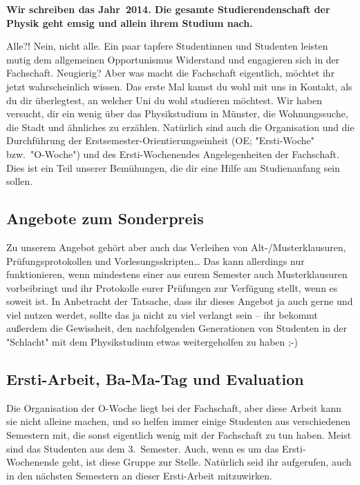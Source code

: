 \begin{multicols}{2}
\renewcommand{\fibelsubsectionpre}{\fibelsubsubsectionpre}
\renewcommand{\fibelsubsectionpost}{\fibelsubsubsectionpost}
\textbf{Wir schreiben das Jahr~2014. Die gesamte Studierendenschaft der Physik geht emsig und allein ihrem Studium nach.}

Alle?! Nein, nicht alle. Ein paar tapfere Studentinnen und Studenten leisten mutig dem allgemeinen Opportunismus Widerstand und engagieren sich in der Fachschaft. Neugierig? Aber was macht die Fachschaft eigentlich, möchtet ihr jetzt wahrscheinlich wissen. Das erste Mal kamst du wohl mit uns in Kontakt, als du dir überlegtest, an welcher Uni du wohl studieren möchtest. Wir haben versucht, dir ein wenig über das Physikstudium in Münster, die Wohnungssuche, die Stadt und ähnliches zu erzählen. Natürlich sind auch die Organisation und die Durchführung der Erstsemester-Orientierungseinheit (OE; "Ersti-Woche" bzw.\ "O-Woche") und des Ersti-Wochenendes Angelegenheiten der Fachschaft. Dies ist ein Teil unserer Bemühungen, die dir eine Hilfe am Studienanfang sein sollen.

\subsection*{Angebote zum Sonderpreis}
Zu unserem Angebot gehört aber auch das Verleihen von Alt-/Musterklausuren, Prüfungsprotokollen und Vorlesungsskripten\dots{} Das kann allerdings nur funktionieren, wenn mindestens einer aus eurem Semester auch Musterklausuren vorbeibringt und ihr Protokolle eurer Prüfungen zur Verfügung stellt, wenn es soweit ist. In Anbetracht der Tatsache, dass ihr dieses Angebot ja auch gerne und viel nutzen werdet, sollte das ja nicht zu viel verlangt sein -- ihr bekommt außerdem die Gewissheit, den nachfolgenden Generationen von Studenten in der "Schlacht" mit dem Physikstudium etwas weitergeholfen zu haben ;-)

\subsection*{Ersti-Arbeit, Ba-Ma-Tag und Evaluation}
Die Organisation der O-Woche liegt bei der Fachschaft, aber diese Arbeit kann sie nicht alleine machen, und so helfen immer einige Studenten aus verschiedenen Semestern mit, die sonst eigentlich wenig mit der Fachschaft zu tun haben. Meist sind das Studenten aus dem 3.~Semester. Auch, wenn es um das Ersti-Wochenende geht, ist diese Gruppe zur Stelle. Natürlich seid ihr aufgerufen, auch in den nächsten Semestern an dieser Ersti-Arbeit mitzuwirken.


\end{multicols}
